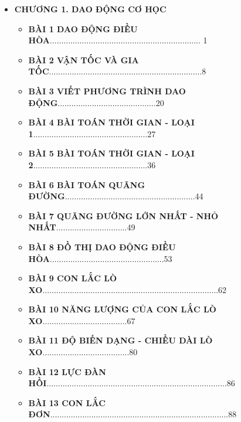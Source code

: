 \vspace*{3\baselineskip}
 \vspace*{3\baselineskip}
\normalsize 
\begin{itemize}
\item[] \textcolor{coolblack}{\textbf{CHƯƠNG 1. DAO ĐỘNG CƠ HỌC}}
\vspace*{.5\baselineskip}
\begin{itemize}
\item[] \textbf{\textcolor{coolblack}{BÀI 1} DAO ĐỘNG ĐIỀU HÒA}.................................................................. \hfill 1
\item[] \textbf{\textcolor{coolblack}{BÀI 2} VẬN TỐC VÀ GIA TỐC}...................................................................\hfill 8
\item[] \textbf{\textcolor{coolblack}{BÀI 3} VIẾT PHƯƠNG TRÌNH DAO ĐỘNG}...........................................\hfill 20
\item[] \textbf{\textcolor{coolblack}{BÀI 4} BÀI TOÁN THỜI GIAN - LOẠI 1}..................................................\hfill 27
\item[] \textbf{\textcolor{coolblack}{BÀI 5} BÀI TOÁN THỜI GIAN - LOẠI 2}..................................................\hfill 36
\item[] \textbf{\textcolor{coolblack}{BÀI 6} BÀI TOÁN QUÃNG ĐƯỜNG}.........................................................\hfill 44
\item[] \textbf{\textcolor{coolblack}{BÀI 7} QUÃNG ĐƯỜNG LỚN NHẤT - NHỎ NHẤT}...............................\hfill 49
\item[] \textbf{\textcolor{coolblack}{BÀI 8} ĐỒ THỊ DAO ĐỘNG ĐIỀU HÒA}..................................................\hfill 53
\item[] \textbf{\textcolor{coolblack}{BÀI 9} CON LẮC LÒ XO}.............................................................................\hfill 62
\item[] \textbf{\textcolor{coolblack}{BÀI 10} NĂNG LƯỢNG CỦA CON LẮC LÒ XO}.....................................\hfill 67
\item[] \textbf{\textcolor{coolblack}{BÀI 11} ĐỘ BIẾN DẠNG - CHIỀU DÀI LÒ XO}......................................\hfill 80
\item[] \textbf{\textcolor{coolblack}{BÀI 12} LỰC ĐÀN HỒI}...............................................................................\hfill 86
\item[] \textbf{\textcolor{coolblack}{BÀI 13} CON LẮC ĐƠN}..............................................................................\hfill 88

\end{itemize}
\end{itemize}
